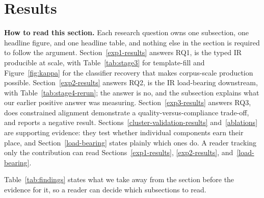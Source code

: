 \documentclass[preprint,12pt]{elsarticle}
\begin{document}
\section{Results}\label{results}

\textbf{How to read this section.} Each research question owns one subsection, one headline
figure, and one headline table, and nothing else in the section is required to follow the
argument. Section~\ref{exp1-results} answers RQ1, is the typed IR producible at scale, with
Table~\ref{tab:stage3} for template-fill and Figure~\ref{fig:kappa} for the classifier recovery
that makes corpus-scale production possible. Section~\ref{exp2-results} answers RQ2, is the IR
load-bearing downstream, with Table~\ref{tab:stage4-rerun}; the answer is no, and the subsection explains what our earlier positive answer was measuring.
Section~\ref{exp3-results} answers RQ3, does constrained alignment demonstrate a
quality-versus-compliance trade-off, and reports a negative result.
Sections~\ref{cluster-validation-results} and~\ref{ablations} are supporting evidence: they test
whether individual components earn their place, and Section~\ref{load-bearing} states plainly
which ones do. A reader tracking only the contribution can read
Sections~\ref{exp1-results}, \ref{exp2-results}, and~\ref{load-bearing}.

Table~\ref{tab:findings} states what we take away from the section before the evidence for it,
so a reader can decide which subsections to read.
\end{document}

